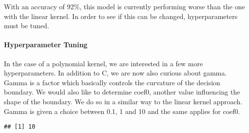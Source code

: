 \documentclass[
]{article}
\newenvironment{Shaded}{\begin{snugshade}}{\end{snugshade}}
\newcommand{\AttributeTok}[1]{\textcolor[rgb]{0.13,0.29,0.53}{#1}}
\newcommand{\DecValTok}[1]{\textcolor[rgb]{0.00,0.00,0.81}{#1}}
\newcommand{\FloatTok}[1]{\textcolor[rgb]{0.00,0.00,0.81}{#1}}
\newcommand{\FunctionTok}[1]{\textcolor[rgb]{0.13,0.29,0.53}{\textbf{#1}}}
\newcommand{\NormalTok}[1]{#1}
\newcommand{\OtherTok}[1]{\textcolor[rgb]{0.56,0.35,0.01}{#1}}
\newcommand{\SpecialCharTok}[1]{\textcolor[rgb]{0.81,0.36,0.00}{\textbf{#1}}}
\newcommand{\StringTok}[1]{\textcolor[rgb]{0.31,0.60,0.02}{#1}}
\begin{document}
With an accuracy of 92\%, this model is currently performing worse than
the one with the linear kernel. In order to see if this can be changed,
hyperparameters must be tuned.

\paragraph{Hyperparameter Tuning}\label{hyperparameter-tuning-1}

In the case of a polynomial kernel, we are interested in a few more
hyperparameters. In addition to C, we are now also curious about gamma.
Gamma is a factor which basically controls the curvature of the decision
boundary. We would also like to determine coef0, another value
influencing the shape of the boundary. We do so in a similar way to the
linear kernel approach. Gamma is given a choice between 0.1, 1 and 10
and the same applies for coef0.

\begin{Shaded}
\end{Shaded}

\begin{verbatim}
## [1] 10
\end{verbatim}

\begin{Shaded}
\end{Shaded}
\end{document}
